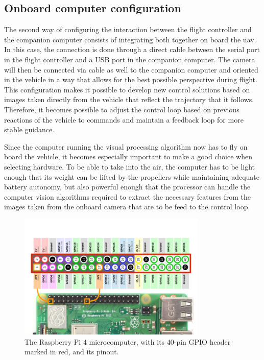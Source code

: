 \subsection{Onboard computer configuration}
\label{subsec:onboard}

The second way of configuring the interaction between the flight controller and the companion computer consists of integrating both together on board the \gls{uav}.
In this case, the connection is done through a direct cable between the serial port in the flight controller and a USB port in the companion computer.
The camera will then be connected via cable as well to the companion computer and oriented in the vehicle in a way that allows for the best possible perspective during flight.
This configuration makes it possible to develop new control solutions based on images taken directly from the vehicle that reflect the trajectory that it follows.
Therefore, it becomes possible to adjust the control loop based on previous reactions of the vehicle to commands and maintain a feedback loop for more stable guidance.

Since the computer running the visual processing algorithm now has to fly on board the vehicle, it becomes especially important to make a good choice when selecting hardware.
To be able to take into the air, the computer has to be light enough that its weight can be lifted by the propellers while maintaining adequate battery autonomy, but also powerful enough that the processor can handle the computer vision algorithms required to extract the necessary features from the images taken from the onboard camera that are to be feed to the control loop.

\begin{figure}
  \centering
  \includegraphics[width=0.8\textwidth,keepaspectratio]{img/rpi4-pinout.png}
  \caption{The Raspberry Pi 4 microcomputer, with its 40-pin GPIO header marked in red, and its pinout.}
  \label{fig:rpi4-pinout}
\end{figure}

